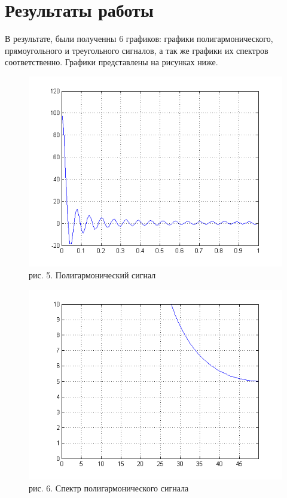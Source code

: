 \documentclass[10pt,a4paper]{report}
\begin{document}
\section{Результаты работы}
В результате, были полученны 6 графиков: графики полигармонического, прямоугольного и треугольного сигналов, а так же графики их спектров соответственно. Графики представлены на рисунках ниже.
\begin{figure}
\begin{center}
\includegraphics[angle=0, scale = 0.9]{5_1.png}\newline
рис. 5. Полигармонический сигнал\newline
\end{center}
\end{figure}
\begin{figure}
\begin{center}
\includegraphics[angle=0, scale = 0.9]{5_2.png}\newline
рис. 6. Спектр полигармонического сигнала\newline
\end{center}
\end{figure}
\end{document}

